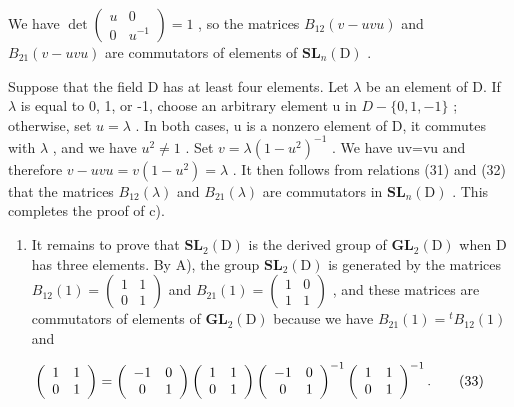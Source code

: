 We have \(\det\left(\begin{matrix}u & 0 \\ 0 & u^{-1}\end{matrix}\right)=1\) , so the matrices \(B_{12}(v-uvu)\) and \(B_{21}(v-uvu)\) are commutators of elements of \(\mathbf{SL}_{n}(\mathrm{D})\) .

Suppose that the field D has at least four elements. Let \(\lambda\) be an element of D. If \(\lambda\) is equal to 0, 1, or -1, choose an arbitrary element u in \(D-\{0,1,-1\}\) ; otherwise, set \(u=\lambda\) . In both cases, u is a nonzero element of D, it commutes with \(\lambda\) , and we have \(u^{2}\neq1\) . Set \(v=\lambda(1-u^{2})^{-1}\) . We have uv=vu and therefore \(v-uvu=v(1-u^{2})=\lambda\) . It then follows from relations (31) and (32) that the matrices \(B_{12}(\lambda)\) and \(B_{21}(\lambda)\) are commutators in \(\mathbf{SL}_{n}(\mathrm{D})\) . This completes the proof of c).

\begin{enumerate}
\def\labelenumi{\Alph{enumi})}
\setcounter{enumi}{2}
\tightlist
\item
  It remains to prove that \(\mathbf{SL}_{2}(\mathrm{D})\) is the derived group of \(\mathbf{GL}_{2}(\mathrm{D})\) when D has three elements. By A), the group \(\mathbf{SL}_{2}(\mathrm{D})\) is generated by the matrices \(B_{12}(1)=(\begin{matrix}{1}&{1}\\ {0}&{1}\end{matrix})\) and \(B_{21}(1)=(\begin{matrix}{1}&{0}\\ {1}&{1}\end{matrix})\) , and these matrices are commutators of elements of \(\mathbf{GL}_{2}(\mathrm{D})\) because we have \(B_{21}(1)={}^{t}B_{12}(1)\) and
\end{enumerate}

\[
\left( \begin{array}{c c} 1 & 1 \\ 0 & 1 \end{array} \right) = \left( \begin{array}{c c} - 1 & 0 \\ 0 & 1 \end{array} \right) \left( \begin{array}{c c} 1 & 1 \\ 0 & 1 \end{array} \right) \left( \begin{array}{c c} - 1 & 0 \\ 0 & 1 \end{array} \right) ^ {- 1} \left( \begin{array}{c c} 1 & 1 \\ 0 & 1 \end{array} \right) ^ {- 1}.\tag{33}
\]

